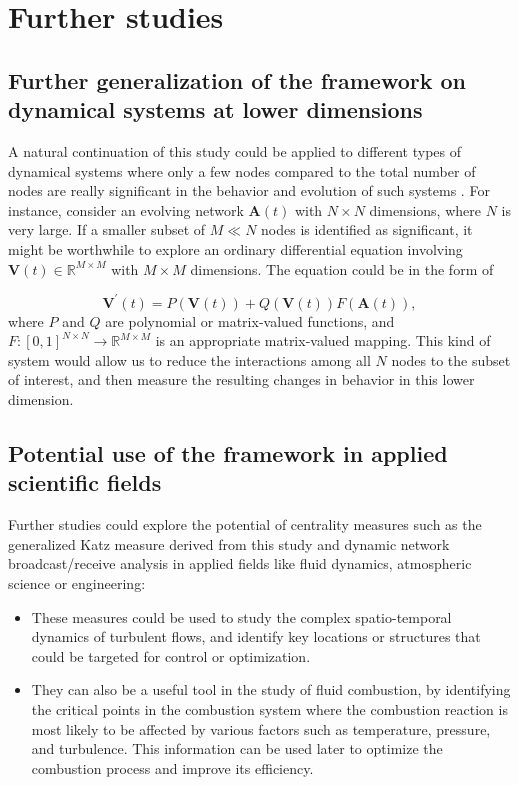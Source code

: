 
\chapter{Further studies}
\label{chap:further}
 
\section*{Further generalization of the framework on dynamical systems at lower dimensions}
A natural continuation of this study could be applied to different types of dynamical systems where only a few nodes compared to the total number of nodes are really significant in the behavior and evolution of such systems \cite{grindrod2014dynamical}. For instance, consider an evolving network $\mathbf{A}(t)$ with $N \times N$ dimensions, where $N$ is very large. If a smaller subset of $M\ll N$ nodes is identified as significant, it might be worthwhile to explore an ordinary differential equation involving $\mathbf{V}(t)\in \mathbb{R}^{M\times M}$ with $M\times M$ dimensions. The equation could be in the form of 

$$\mathbf{V}^{\prime}(t)=P(\mathbf{V}(t)) + Q(\mathbf{V}(t))F(\mathbf{A}(t)),$$ where $P$ and $Q$ are polynomial or matrix-valued functions, and $F: [0, 1]^{N×N} \to \mathbb{R}^{M\times M}$ is an appropriate matrix-valued mapping. This kind of system would allow us to reduce the interactions among all $N$ nodes to the subset of interest, and then measure the resulting changes in behavior in this lower dimension.

\section*{Potential use of the framework in applied scientific fields} 
Further studies could explore the potential of centrality measures such as the generalized Katz measure derived from this study and dynamic network broadcast/receive analysis in applied fields like fluid dynamics, atmospheric science or engineering: 

\begin{itemize}
  \item These measures could be used to study the complex spatio-temporal dynamics of turbulent flows, and identify key locations or structures that could be targeted for control or optimization. 
  \item They can also be a useful tool in the study of fluid combustion, by identifying the critical points in the combustion system where the combustion reaction is most likely to be affected by various factors such as temperature, pressure, and turbulence. This information can be used later to optimize the combustion process and improve its efficiency.
\end{itemize}
	
